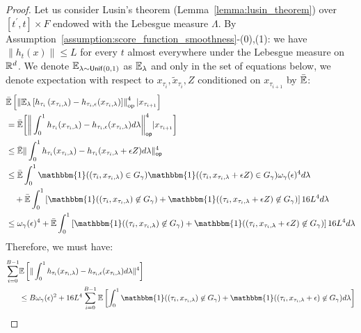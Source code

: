 \begin{proof}

Let us consider Lusin's theorem (Lemma~\ref{lemma:lusin_theorem}) over $[t^{\prime},t]\times F$ endowed with the Lebesgue measure $\Lambda$. By Assumption~\ref{assumption:score_function_smoothness}-(0),(1): we have $\|h_t(x)\| \leq L$ for every $t$ almost everywhere under the Lebesgue measure on $\mathbb{R}^d$. We denote $\mathbb{E}_{\lambda \sim \mathsf{Unif}(0,1)}$ as $\mathbb{E}_{\lambda}$ and only in the set of equations below, we denote expectation with respect to ${x_{\tau_{i}}, \tilde{x}_{\tau_{i}}},Z$ conditioned on $x_{\tau_{i+1}}$ by $\bar{\mathbb{E}}$:
\begin{align}
& \bar{\E}\bbb{\normop{\E_{\lambda}\bbb{h_{\tau_{i}}\bb{x_{\tau_{i},\lambda}} - h_{\tau_{i}, \epsilon}(x_{\tau_{i},\lambda}) }}^{4}|x_{\tau_{i+1}}} \\
&= \bar{\E}\biggr[\biggr\|\int_{0}^{1}  h_{\tau_i}(x_{\tau_i,\lambda}) - h_{\tau_i,\epsilon}(x_{\tau_i,\lambda}) d\lambda\biggr\|_{\mathsf{op}}^4|x_{\tau_{i+1}}\biggr] \nonumber \\
&\leq \bar{\E}\|\int_{0}^{1} h_{\tau_i}(x_{\tau_i,\lambda}) - h_{\tau_i}(x_{\tau_i,\lambda}+\epsilon Z) d\lambda\|_{\mathsf{op}}^4 \nonumber \\
&\leq \bar{\E}\int_{0}^{1}\mathbbm{1}((\tau_i,x_{\tau_i,\lambda}) \in G_{\gamma})\mathbbm{1}((\tau_i,x_{\tau_i,\lambda}+\epsilon Z) \in G_{\gamma}) \omega_{\gamma}(\epsilon)^4 d\lambda \nonumber \\
&\quad + \bar{\E}\int_{0}^{1}\left[\mathbbm{1}((\tau_i,x_{\tau_i,\lambda}) \not\in G_{\gamma})+\mathbbm{1}((\tau_i,x_{\tau_i,\lambda}+\epsilon Z) \not\in G_{\gamma})\right] 16 L^4 d\lambda \nonumber \\
&\leq \omega_{\gamma}(\epsilon)^4 + \bar{\E}\int_{0}^{1}\left[\mathbbm{1}((\tau_i,x_{\tau_i,\lambda}) \not\in G_{\gamma})+\mathbbm{1}((\tau_i,x_{\tau_i,\lambda}+\epsilon Z) \not\in G_{\gamma})\right] 16L^4 d\lambda 
\end{align}
Therefore, we must have:
\begin{align}
\sum_{i=0}^{B-1}&\E\bbb{\|\int_{0}^{1}  h_{\tau_i}(x_{\tau_i,\lambda}) - h_{\tau_i,\epsilon}(x_{\tau_i,\lambda}) d\lambda\|^4} \nonumber \\
&\leq B\omega_{\gamma}(\epsilon)^2 + 16 L^4\sum_{i=0}^{B-1}\E\left[\int_{0}^{1}\mathbbm{1}((\tau_i,x_{\tau_i,\lambda}) \not\in G_{\gamma})+\mathbbm{1}((\tau_i,x_{\tau_i,\lambda}+\epsilon) \not\in G_{\gamma})d\lambda\right]  \nonumber
\end{align}
\end{proof}

